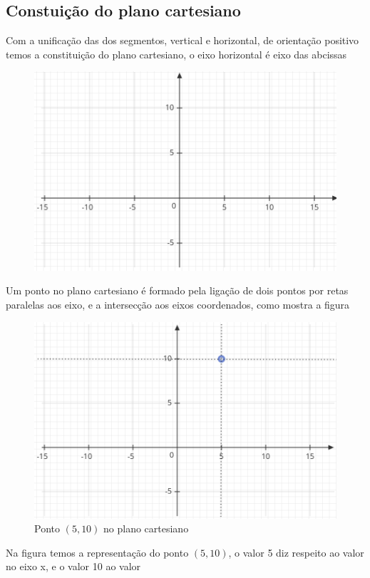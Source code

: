 \begin{multicols*}{2}
    \subsection{Constuição do plano cartesiano}
    Com a unificação das dos segmentos, vertical e horizontal, de orientação positivo temos a constituição do plano cartesiano, o eixo horizontal é eixo das abcissas

    \begin{figure}[H]
        \centering
        \includegraphics[scale=0.5]{assets/rafael/img25.png}
    \end{figure}
    Um ponto no plano cartesiano é formado pela ligação de dois pontos por retas paralelas aos eixo, e a intersecção aos eixos coordenados, como mostra a figura
    \begin{figure}[H]
        \centering
        \caption{Ponto $(5,10)$ no plano cartesiano}
        \includegraphics[scale=0.5]{assets/rafael/img26.png}
    \end{figure}

    Na figura temos a representação do ponto $(5,10)$, o valor 5 diz respeito ao valor no eixo x, e o valor 10 ao valor

\end{multicols*}
